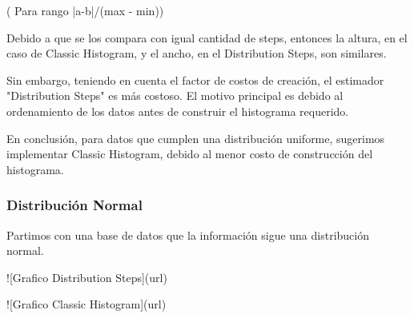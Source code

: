 \documentclass[10pt, a4paper,english,spanish,hidelinks]{article}
\begin{document}
( Para rango |a-b|/(max - min))


Debido a que se los compara con igual cantidad de steps, entonces la altura, en el caso de Classic Histogram, y el ancho, en el Distribution Steps, son similares.

Sin embargo, teniendo en cuenta el factor de costos de creación, el estimador "Distribution Steps" es más costoso. El motivo principal es debido al ordenamiento de los datos antes de construir el histograma requerido.

En conclusión, para datos que cumplen una distribución uniforme, sugerimos implementar Classic Histogram, debido al menor costo de construcción del histograma.


\subsubsection{Distribución Normal}

Partimos con una base de datos que la información sigue una distribución normal.

![Grafico Distribution Steps](url)

![Grafico Classic Histogram](url)
\end{document}

